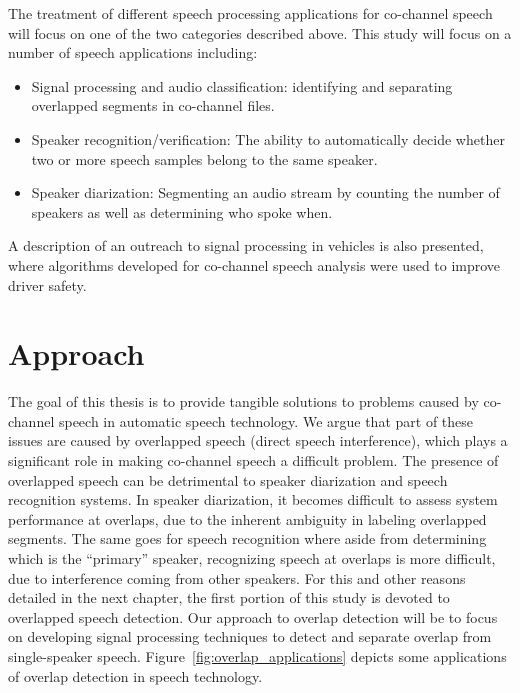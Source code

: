 The treatment of different speech processing applications for co-channel speech will focus on one of the two categories described above. 
This study will focus on a number of speech applications including: 
\begin{itemize}
	\item Signal processing and audio classification: identifying and separating overlapped segments in co-channel files. 
	\item Speaker recognition/verification: The ability to automatically decide whether two or more speech samples belong to the same speaker. 
	\item Speaker diarization: Segmenting an audio stream by counting the number of speakers as well as determining who spoke when. 
\end{itemize}

A description of an outreach to signal processing in vehicles is also presented, where algorithms developed for co-channel speech analysis were used to improve driver safety. 

\section{Approach}

The goal of this thesis is to provide tangible solutions to problems caused by co-channel speech in automatic speech technology. 
We argue that part of these issues are caused by overlapped speech (direct speech interference), which plays a significant role in making co-channel speech a difficult problem. 
The presence of overlapped speech can be detrimental to speaker diarization and speech recognition systems. 
In speaker diarization, it becomes difficult to assess system performance at overlaps, due to the inherent ambiguity in labeling overlapped segments. 
The same goes for speech recognition where aside from determining which is the ``primary'' speaker, recognizing speech at overlaps is more difficult, due to interference coming from other speakers. 
For this and other reasons detailed in the next chapter, the first portion of this study is devoted to overlapped speech detection. 
Our approach to overlap detection will be to focus on developing signal processing techniques to detect and separate overlap from single-speaker speech. Figure~\ref{fig:overlap_applications} depicts some applications of overlap detection in speech technology. 

